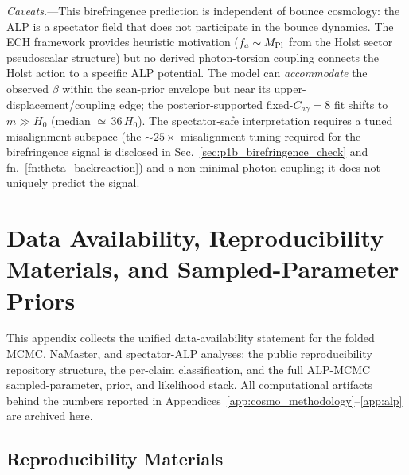 \documentclass[aps,prd,twocolumn,superscriptaddress,showpacs,preprintnumbers,nofootinbib,longbibliography,floatfix]{revtex4-2}
\newcommand{\MPl}{M_{\rm Pl}}
\begin{document}
\textit{Caveats.}---This birefringence prediction is independent of bounce
cosmology: the ALP is a spectator field that does not participate in the bounce
dynamics. The ECH framework provides heuristic motivation ($f_a\sim\MPl$ from
the Holst sector pseudoscalar structure) but no derived photon-torsion coupling
connects the Holst action to a specific ALP potential. The model can
\textit{accommodate} the observed $\beta$ within the scan-prior envelope
but near its upper-displacement/coupling edge; the posterior-supported
fixed-$C_{a\gamma}\!=\!8$ fit shifts to $m\!\gg\!H_0$ (median ${\simeq}\,36\,H_0$).
The spectator-safe interpretation requires a tuned misalignment
subspace (the $\sim 25\times$ misalignment tuning required for
the birefringence signal is disclosed in Sec.~\ref{sec:p1b_birefringence_check} and
fn.~\ref{fn:theta_backreaction}) and a non-minimal photon coupling; it
does not uniquely predict the signal.


\section{Data Availability, Reproducibility Materials, and Sampled-Parameter Priors}\label{app:data_availability}

This appendix collects the unified data-availability statement for the folded
MCMC, NaMaster, and spectator-ALP analyses: the public reproducibility
repository structure, the per-claim classification, and the full ALP-MCMC
sampled-parameter, prior, and likelihood stack. All computational artifacts
behind the numbers reported in
Appendices~\ref{app:cosmo_methodology}--\ref{app:alp} are archived here.

\subsection{Reproducibility Materials}\label{app:reproducibility}
\end{document}

